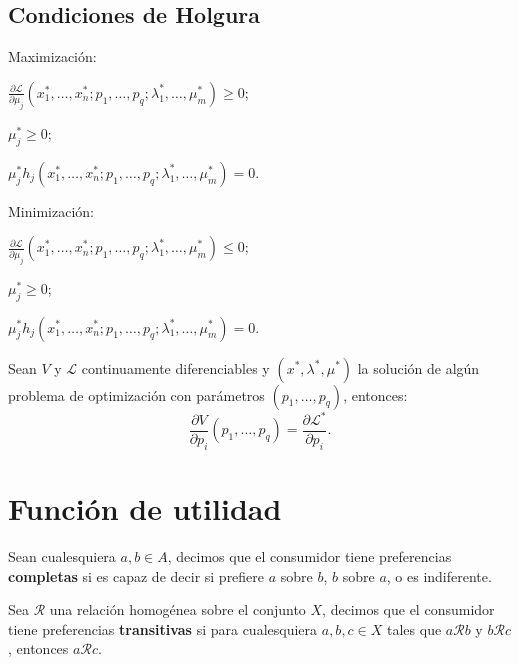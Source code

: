 \documentclass[8pt,a4paper]{extarticle}
\begin{document}
\begin{multicols}{3}
	\subsection*{Condiciones de Holgura}

	\begin{bulletlist}
		\item Maximización:
		\item[] $\displaystyle \frac{\partial \mathcal{L}}{\partial \mu_j} (x_{1}^{*}, \ldots, x_{n}^{*}; p_1, \ldots, p_q; \lambda_{1}^{*}, \ldots, \mu_{m}^{*}) \ge 0$;
		\item[] $\displaystyle \mu_j^{*} \ge 0$;
		\item[] $\displaystyle \mu_j^{*} h_j (x_{1}^{*}, \ldots, x_{n}^{*}; p_1, \ldots, p_q; \lambda_{1}^{*}, \ldots, \mu_{m}^{*}) = 0$.
		\item Minimización:
		\item[] $\displaystyle \frac{\partial \mathcal{L}}{\partial \mu_j} (x_{1}^{*}, \ldots, x_{n}^{*}; p_1, \ldots, p_q; \lambda_{1}^{*}, \ldots, \mu_{m}^{*}) \le 0$;
		\item[] $\displaystyle \mu_j^{*} \ge 0$;
		\item[] $\displaystyle \mu_j^{*} h_j (x_{1}^{*}, \ldots, x_{n}^{*}; p_1, \ldots, p_q; \lambda_{1}^{*}, \ldots, \mu_{m}^{*}) = 0$.
	\end{bulletlist}

	\begin{boxtheo}
		Sean $V$ y $\mathcal{L}$ continuamente diferenciables y $(x^{*}, \lambda^{*}, \mu^{*})$ la solución de algún problema de optimización con parámetros $(p_1, \ldots, p_q)$, entonces:
		\[
			\frac{\partial V}{\partial p_i} (p_1, \ldots, p_q) = \frac{\partial \mathcal{L}^{*}}{\partial p_i}
			.\]
	\end{boxtheo}

	\newpage

	\section{Función de utilidad}

	\begin{boxdef}[Completitud]
		Sean cualesquiera $a, b \in A$, decimos que el consumidor tiene preferencias \textbf{completas} si es capaz de decir si prefiere $a$ sobre $b$, $b$ sobre $a$, o es indiferente.
	\end{boxdef}

	\begin{boxdef}[Transitividad]
		Sea $\mathcal{R}$ una relación homogénea sobre el conjunto $X$, decimos que el consumidor tiene preferencias \textbf{transitivas} si para cualesquiera $a, b, c \in X$ tales que $a \mathcal{R} b$ y $b \mathcal{R} c$, entonces $a \mathcal{R} c$.
	\end{boxdef}


\end{multicols}
\end{document}
